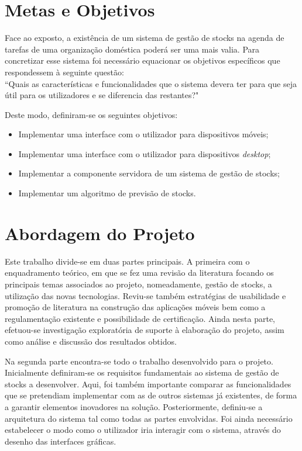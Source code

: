\section{Metas e Objetivos} \label{sec12}
Face ao exposto, a existência de um sistema de gestão de stocks na agenda de tarefas de uma organização doméstica poderá ser uma mais valia. Para concretizar esse sistema foi necessário equacionar os objetivos específicos que respondessem à seguinte questão: \\
``Quais as características e funcionalidades que o sistema devera ter para que seja útil para os utilizadores e se diferencia das restantes?"

Deste modo, definiram-se os seguintes objetivos:
\begin{itemize} \itemsep 0pt
	\item Implementar uma interface com o utilizador para dispositivos móveis;
	\item Implementar uma interface com o utilizador para dispositivos \textit{desktop};
	\item Implementar a componente servidora de um sistema de gestão de stocks;
	\item Implementar um algoritmo de previsão de stocks.
\end{itemize}

%
%
\section{Abordagem do Projeto} \label{sec13}

Este trabalho divide-se em duas partes principais. A primeira com o enquadramento teórico, em que se fez uma revisão da literatura focando os principais temas associados ao projeto, nomeadamente, gestão de stocks, a utilização das novas tecnologias. Reviu-se também estratégias de usabilidade e promoção de literatura na construção das aplicações móveis bem como a regulamentação existente e possibilidade de certificação.
Ainda nesta parte, efetuou-se investigação exploratória de suporte à elaboração do projeto, assim como análise e discussão dos resultados obtidos.

Na segunda parte encontra-se todo o trabalho desenvolvido para o projeto. Inicialmente definiram-se os requisitos fundamentais ao sistema de gestão de stocks a desenvolver. Aqui, foi também importante comparar as funcionalidades que se pretendiam implementar com as de outros sistemas já existentes, de forma a garantir elementos inovadores na solução. Posteriormente, definiu-se a arquitetura do sistema tal como todas as partes envolvidas. Foi ainda necessário estabelecer o modo como o utilizador iria interagir com o sistema, através do desenho das interfaces gráficas.

